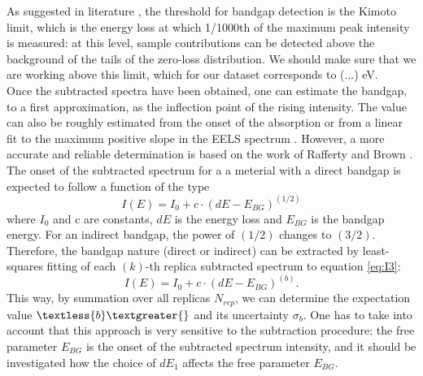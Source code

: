 As suggested in literature \cite{15,14}, the threshold for bandgap detection is the Kimoto limit, which is the energy loss at which 1/1000th of the maximum peak intensity is measured: at this level, sample contributions can be detected above the background of the tails of the zero-loss distribution. We should make sure that we are working above this limit, which for our dataset corresponds to (...) eV.\\

Once the subtracted spectra have been obtained, one can estimate the bandgap, to a first approximation, as the inflection point of the rising intensity. The value can also be roughly estimated from the onset of the absorption or from a linear fit to the maximum positive slope in the EELS spectrum \cite{Schamm:2003}. However, a more accurate and reliable determination is based on the work of Rafferty and Brown  \cite{Rafferty:2000}. The onset of the subtracted spectrum for a a meterial with a direct bandgap is expected to follow a function of the type
\begin{equation} \label{eq:I1}
    I(E) = I_0 + c\cdot(dE-E_{BG})^{(1/2)}
\end{equation}
where $I_0$ and c are constants, $dE$ is the energy loss and $E_{BG}$ is the bandgap energy. For an indirect bandgap, the power of $(1/2)$ changes to $(3/2)$. Therefore, the bandgap nature (direct or indirect) can be extracted by least-squares fitting of each $(k)$-th replica subtracted spectrum to equation \ref{eq:I3}:
\begin{equation} \label{eq:I3}
    I(E) = I_0 + c\cdot(dE-E_{BG})^{(b)}.
\end{equation}
This way, by summation over all replicas $N_{rep}$, we can determine the expectation value $\textless{b}\textgreater{}$ and its uncertainty $\sigma_b$. One has to take into account that this approach is very sensitive to the subtraction procedure: the free parameter $E_{BG}$ is the onset of the subtracted spectrum intensity, and it should be investigated how the choice of $dE_1$ affects the free parameter $E_{BG}$.

